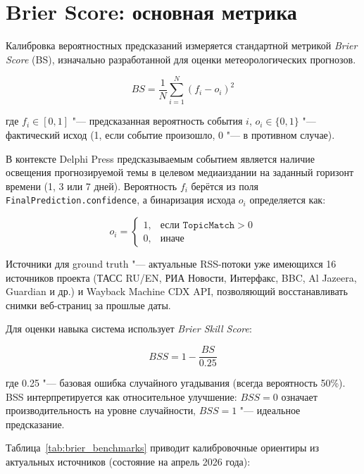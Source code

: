 \section{Brier Score: основная метрика}

Калибровка вероятностных предсказаний измеряется стандартной метрикой \emph{Brier Score} (BS), изначально разработанной для оценки метеорологических прогнозов.

\begin{equation}
BS = \frac{1}{N} \sum_{i=1}^{N} (f_i - o_i)^2
\label{eq:brier_score}
\end{equation}

где $f_i \in [0,1]$ "--- предсказанная вероятность события $i$, $o_i \in \{0,1\}$ "--- фактический исход (1, если событие произошло, 0 "--- в противном случае).

В контексте Delphi Press предсказываемым событием является наличие освещения прогнозируемой темы в целевом медиаиздании на заданный горизонт времени (1, 3 или 7 дней). Вероятность $f_i$ берётся из поля \texttt{FinalPrediction.confidence}, а бинаризация исхода $o_i$ определяется как:

\begin{equation}
o_i = \begin{cases}
1, & \text{если } \texttt{TopicMatch} > 0 \\
0, & \text{иначе}
\end{cases}
\end{equation}

Источники для ground truth "--- актуальные RSS-потоки уже имеющихся 16 источников проекта (ТАСС RU/EN, РИА Новости, Интерфакс, BBC, Al Jazeera, Guardian и др.) и Wayback Machine CDX API, позволяющий восстанавливать снимки веб-страниц за прошлые даты.

Для оценки навыка система использует \emph{Brier Skill Score}:

\begin{equation}
BSS = 1 - \frac{BS}{0.25}
\end{equation}

где 0.25 "--- базовая ошибка случайного угадывания (всегда вероятность 50\%). BSS интерпретируется как относительное улучшение: $BSS = 0$ означает производительность на уровне случайности, $BSS = 1$ "--- идеальное предсказание.

Таблица~\ref{tab:brier_benchmarks} приводит калибровочные ориентиры из актуальных источников (состояние на апрель 2026 года):

